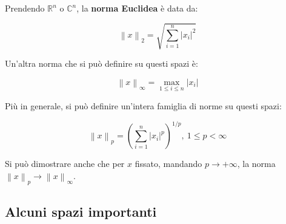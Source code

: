 \documentclass[11pt, a4paper]{scrartcl}
\theoremstyle{definition}
\numberwithin{esempio}{section}
\theoremstyle{definition}
\numberwithin{obs}{section}
\numberwithin{nota}{section}
\newenvironment{boxenv}[1][]{
    \begin{eqbox}[#1]
    }{
   \end{eqbox}
}
\numberwithin{equation}{subsection}
\begin{document}
Prendendo $\mathbb{R}^n$ o $\mathbb{C}^n$, la \textbf{norma Euclidea} \`e data da:
\begin{boxenv}[]
\begin{equation}
	\left\lVert x \right\rVert _2 = \sqrt{\sum_{i=1}^{n} \lvert x_i \rvert ^2} 
\end{equation}
\end{boxenv}
\noindent Un'altra norma che si pu\`o definire su questi spazi \`e:
\begin{boxenv}[]
\begin{equation}
	\left\lVert x \right\rVert _\infty = \max _{1\le i\le n} \lvert x_i \rvert 
\end{equation}
\end{boxenv}
\noindent Pi\`u in generale, si pu\`o definire un'intera famiglia di norme su questi spazi:
\begin{boxenv}[]
\begin{equation}
	\left\lVert x \right\rVert _p = \left(\sum_{i=1}^{n} \lvert x_i \rvert ^p\right) ^{1 / p} , \ 1\le p < \infty
\end{equation}
\end{boxenv}
\noindent Si pu\`o dimostrare anche che per $x$ fissato, mandando $p \to +\infty$, la norma $\left\lVert x \right\rVert _p \to \left\lVert x \right\rVert _\infty$.
\subsection{Alcuni spazi importanti}
\end{document}
